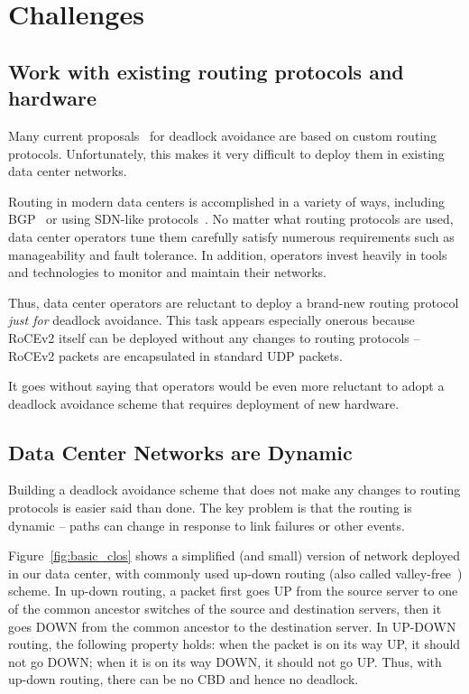 \section{Challenges}
\label{sec:challenges}

\subsection{Work with existing routing protocols and hardware}
\label{sec:incremental}

Many current proposals~\cite{tcpbolt, karol2003prevention,
sancho2004,lash,wu2003fault} for deadlock avoidance are based on custom routing
protocols. Unfortunately, this makes it very difficult to deploy them in
existing data center networks.

Routing in modern data centers is accomplished in a variety of ways, including
BGP~\cite{vl2, facebookrouting} or using SDN-like
protocols~\cite{singh2015jupiter}.  No matter what routing protocols are used,
data center operators tune them carefully satisfy numerous requirements such as
manageability and fault tolerance.  In addition, operators invest heavily in
tools and technologies to monitor and maintain their networks.

Thus, data center operators are reluctant to deploy a brand-new routing protocol
{\em just for} deadlock avoidance. This task appears especially onerous because
RoCEv2 itself can be deployed without any changes to routing protocols -- RoCEv2
packets are encapsulated in standard UDP packets.

It goes without saying that operators would be even more reluctant to
adopt a deadlock avoidance scheme that requires deployment of new hardware. 

\subsection{Data Center Networks are Dynamic}\label{sec:reroute}

Building a deadlock avoidance scheme that does not make any changes to routing
protocols is easier said than done. The key problem is that the routing is
dynamic -- paths can change in response to link failures or other events.

Figure~\ref{fig:basic_clos} shows a simplified (and small) version
of network deployed in our data center, with commonly used up-down routing (also
called valley-free~\cite{qiu2007toward}) scheme.  In up-down routing, a packet first
goes UP from the source server to one of the common ancestor switches of the
source and destination servers, then it goes DOWN from the common ancestor to
the destination server.  In UP-DOWN routing, the following property holds: when
the packet is on its way UP, it should not go DOWN; when it is on its way DOWN,
it should not go UP. Thus, with up-down routing, there can be no CBD and hence
no deadlock.

